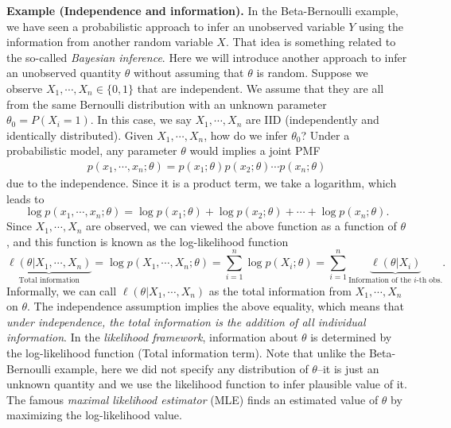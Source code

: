 \documentclass[twoside]{article}
\begin{document}
{\bf Example (Independence and information).}
In the Beta-Bernoulli example, we have seen a probabilistic approach to infer an unobserved variable $Y$ 
using the information from another random variable $X$. 
That idea is something related to the so-called \emph{Bayesian inference}. 
Here we will introduce another approach to infer an unobserved quantity $\theta$ without assuming that $\theta$ is random. 
Suppose we observe $X_1,\cdots, X_n\in\{0,1\}$ that are independent.
We assume that they are all from the same Bernoulli distribution with an unknown parameter $\theta_0 = P(X_i=1)$.
In this case, we say $X_1,\cdots, X_n$ are IID (independently and identically distributed).
Given $X_1,\cdots, X_n$, how do we infer $\theta_0$? 
Under a probabilistic model, any parameter $\theta$ would implies a joint PMF
\begin{align*}
p(x_1,\cdots, x_n;\theta) = p(x_1;\theta)p(x_2;\theta)\cdots p(x_n;\theta)
\end{align*}
due to the independence. 
Since  it is a product term, we take a logarithm, which leads to 
$$
\log p(x_1,\cdots, x_n;\theta) = \log p(x_1;\theta)+\log p(x_2;\theta)+\cdots +\log p(x_n;\theta).
$$
Since $X_1,\cdots, X_n$ are observed, we can viewed the above function as a function of $\theta$,
and this function is known as the log-likelihood function
$$
\underbrace{\ell(\theta|X_1,\cdots, X_n)}_{\mbox{Total information}} = \log p(X_1,\cdots, X_n;\theta) = \sum_{i=1}^n \log p(X_i;\theta) = \sum_{i=1}^n\underbrace{\ell(\theta|X_i)}_{\mbox{Information of the $i$-th obs.}}.
$$
Informally, we can call $\ell(\theta|X_1,\cdots, X_n)$ as the total information from $X_1,\cdots, X_n$ on $\theta$. 
The independence assumption implies the above equality, which means that 
\emph{under independence, the total information is the addition of all individual information}.
In the \emph{likelihood framework}, information about $\theta$ is determined by
the log-likelihood function (Total information term). 
Note that unlike the Beta-Bernoulli example, here we did not specify any distribution of $\theta$--it is just an unknown quantity
and we use the likelihood function to infer plausible value of it. 
The famous \emph{maximal likelihood estimator} (MLE)
finds an estimated value of $\theta$ by maximizing the log-likelihood value.
\end{document}
